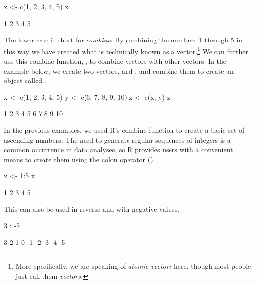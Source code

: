 \begin{inR}
x <- c(1, 2, 3, 4, 5)
x
\end{inR}

\begin{outR}
[1] 1 2 3 4 5
\end{outR}

The lower case  is short for \textit{combine}. By combining the numbers 1 through 5 in this way we have created what is technically known as a \gls{vector}.\footnote{More specifically, we are speaking of \textit{atomic vectors} here, though most people just call them \textit{vectors.}} We can further use this combine function, , to combine vectors with other vectors. In the example below, we create two vectors,  and , and combine them to create an object called .

\begin{inR}
x <- c(1, 2, 3, 4, 5)
y <- c(6, 7, 8, 9, 10)
z <- c(x, y)
z
\end{inR}
\begin{outR}
[1]  1  2  3  4  5  6  7  8  9 10
\end{outR}

\begin{figure*}[!b]
    \centering
\begin{mdframed}[style = miscFrame, frametitle = Box 1.2: How to Use Your Colon Effectively \R{:}]

In the previous examples, we used R's combine function to create a basic set of ascending numbers. The need to generate regular sequences of integers is a common occurrence in data analyses, so R provides users with a convenient means to create them using the \gls{colon operator} (\R{:}).

\begin{inR}
x <- 1:5
x
\end{inR}
\vspace{1cm}
\begin{outR}
[1] 1 2 3 4 5
\end{outR} 

\vspace{\baselineskip}

This can also be used in reverse and with negative values.

\begin{inR}
3 : -5
\end{inR}
\vspace{1cm}
\begin{outR}
[1] 3  2  1  0 -1 -2 -3 -4 -5
\end{outR}

\end{mdframed}
\end{figure*}

